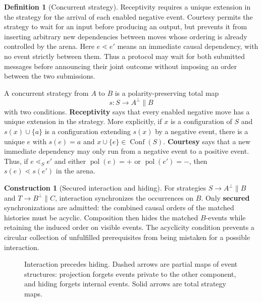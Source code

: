 \documentclass[11pt,a4paper]{article}
\numberwithin{equation}{section}
\theoremstyle{definition}
\newtheorem{definition}[theorem]{Definition}
\newtheorem{construction}[construction]{Construction}
\theoremstyle{remark}
\theoremstyle{plain}
\begin{document}
\begin{definition}[Concurrent strategy]
\label{def:egt-concurrent-strategy}
Receptivity requires a unique extension in the strategy for the arrival of
each enabled negative event. Courtesy permits the strategy to wait for an
input before producing an output, but prevents it from inserting arbitrary
new dependencies between moves whose ordering is already controlled by the
arena. Here $e\lessdot e'$ means an immediate causal dependency, with no
event strictly between them. Thus a protocol may wait for both submitted
messages before announcing their joint outcome without imposing an order
between the two submissions.

A concurrent strategy from $A$ to $B$ is a polarity-preserving total map
\[
 s:S\longrightarrow A^\perp\parallel B
\]
with two conditions. \textbf{Receptivity} says that every enabled negative move
has a unique extension in the strategy. More explicitly, if $x$ is a
configuration of $S$ and $s(x)\cup\{a\}$ is a configuration extending $s(x)$ by
a negative event, there is a unique $e$ with $s(e)=a$ and
$x\cup\{e\}\in\operatorname{Conf}(S)$. \textbf{Courtesy} says that a new immediate
dependency may only run from a negative event to a positive event. Thus, if
$e\mathrel{\lessdot}_S e'$ and either $\operatorname{pol}(e)=+$ or
$\operatorname{pol}(e')=-$, then $s(e)\mathrel{\lessdot}s(e')$ in the arena.
\end{definition}

\begin{construction}[Secured interaction and hiding]
For strategies $S\to A^\perp\parallel B$ and
$T\to B^\perp\parallel C$, interaction synchronizes the occurrences on $B$.
Only \textbf{secured} synchronizations are admitted: the combined causal orders
of the matched histories must be acyclic. Composition then hides the matched
$B$-events while retaining the induced order on visible events. The
acyclicity condition prevents a circular collection of unfulfilled
prerequisites from being mistaken for a possible interaction.
\end{construction}

\begin{figure}[htbp]
\centering
{}
\caption{Interaction precedes hiding. Dashed arrows are partial maps of
event structures: projection forgets events private to the other component,
and hiding forgets internal events. Solid arrows are total strategy maps.}
\end{figure}
\end{document}
